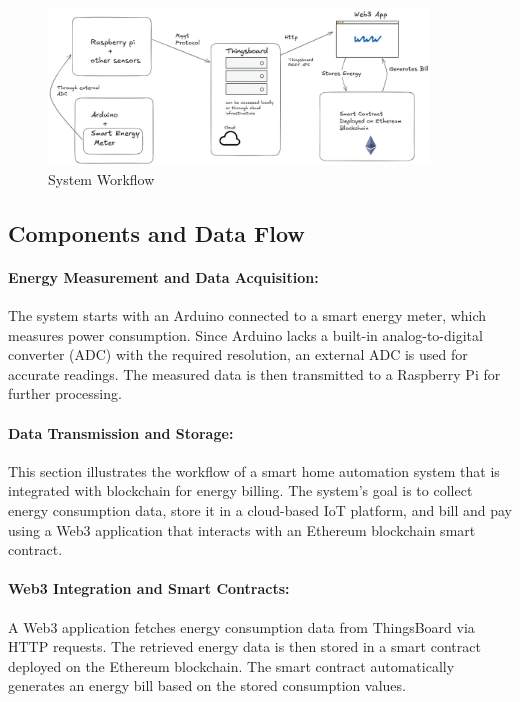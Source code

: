 \documentclass[a4paper,12pt]{report}
\begin{document}
\begin{figure}[h]
    \centering
    \includegraphics[width=0.9\textwidth]{basicArchitecture.png}
    \caption{System Workflow}
    \label{fig:workflow}
\end{figure}

\subsection{Components and Data Flow}

\paragraph{Energy Measurement and Data Acquisition:} The system starts with an Arduino connected to a smart energy meter, which measures power consumption. Since Arduino lacks a built-in analog-to-digital converter (ADC) with the required resolution, an external ADC is used for accurate readings. The measured data is then transmitted to a Raspberry Pi for further processing.

\paragraph{Data Transmission and Storage:} This section illustrates the workflow of a smart home automation system that is integrated with blockchain for energy billing. The system's goal is to collect energy consumption data, store it in a cloud-based IoT platform, and bill and pay using a Web3 application that interacts with an Ethereum blockchain smart contract.

\paragraph{Web3 Integration and Smart Contracts:} A Web3 application fetches energy consumption data from ThingsBoard via HTTP requests. The retrieved energy data is then stored in a smart contract deployed on the Ethereum blockchain. The smart contract automatically generates an energy bill based on the stored consumption values.
\end{document}
